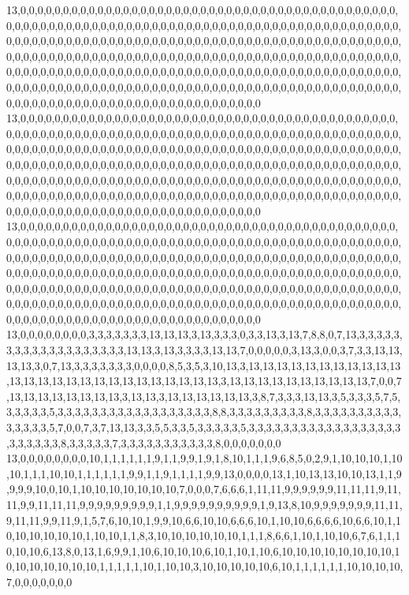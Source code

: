13,0,0,0,0,0,0,0,0,0,0,0,0,0,0,0,0,0,0,0,0,0,0,0,0,0,0,0,0,0,0,0,0,0,0,0,0,0,0,0,0,0,0,0,0,0,0,0,0,0,0,0,0,0,0,0,0,0,0,0,0,0,0,0,0,0,0,0,0,0,0,0,0,0,0,0,0,0,0,0,0,0,0,0,0,0,0,0,0,0,0,0,0,0,0,0,0,0,0,0,0,0,0,0,0,0,0,0,0,0,0,0,0,0,0,0,0,0,0,0,0,0,0,0,0,0,0,0,0,0,0,0,0,0,0,0,0,0,0,0,0,0,0,0,0,0,0,0,0,0,0,0,0,0,0,0,0,0,0,0,0,0,0,0,0,0,0,0,0,0,0,0,0,0,0,0,0,0,0,0,0,0,0,0,0,0,0,0,0,0,0,0,0,0,0,0,0,0,0,0,0,0,0,0,0,0,0,0,0,0,0,0,0,0,0,0,0,0,0,0,0,0,0,0,0,0,0,0,0,0,0,0,0,0,0,0,0,0,0,0,0,0,0,0,0,0,0,0,0,0,0,0,0,0,0,0,0,0,0,0,0,0,0,0,0,0,0,0,0,0,0,0,0,0,0,0,0,0,0,0,0,0,0,0,0,0,0,0,0,0,0,0,0,0,0,0,0,0,0,0,0,0,0,0,0
13,0,0,0,0,0,0,0,0,0,0,0,0,0,0,0,0,0,0,0,0,0,0,0,0,0,0,0,0,0,0,0,0,0,0,0,0,0,0,0,0,0,0,0,0,0,0,0,0,0,0,0,0,0,0,0,0,0,0,0,0,0,0,0,0,0,0,0,0,0,0,0,0,0,0,0,0,0,0,0,0,0,0,0,0,0,0,0,0,0,0,0,0,0,0,0,0,0,0,0,0,0,0,0,0,0,0,0,0,0,0,0,0,0,0,0,0,0,0,0,0,0,0,0,0,0,0,0,0,0,0,0,0,0,0,0,0,0,0,0,0,0,0,0,0,0,0,0,0,0,0,0,0,0,0,0,0,0,0,0,0,0,0,0,0,0,0,0,0,0,0,0,0,0,0,0,0,0,0,0,0,0,0,0,0,0,0,0,0,0,0,0,0,0,0,0,0,0,0,0,0,0,0,0,0,0,0,0,0,0,0,0,0,0,0,0,0,0,0,0,0,0,0,0,0,0,0,0,0,0,0,0,0,0,0,0,0,0,0,0,0,0,0,0,0,0,0,0,0,0,0,0,0,0,0,0,0,0,0,0,0,0,0,0,0,0,0,0,0,0,0,0,0,0,0,0,0,0,0,0,0,0,0,0,0,0,0,0,0,0,0,0,0,0,0,0,0,0,0,0,0,0,0,0,0
13,0,0,0,0,0,0,0,0,0,0,0,0,0,0,0,0,0,0,0,0,0,0,0,0,0,0,0,0,0,0,0,0,0,0,0,0,0,0,0,0,0,0,0,0,0,0,0,0,0,0,0,0,0,0,0,0,0,0,0,0,0,0,0,0,0,0,0,0,0,0,0,0,0,0,0,0,0,0,0,0,0,0,0,0,0,0,0,0,0,0,0,0,0,0,0,0,0,0,0,0,0,0,0,0,0,0,0,0,0,0,0,0,0,0,0,0,0,0,0,0,0,0,0,0,0,0,0,0,0,0,0,0,0,0,0,0,0,0,0,0,0,0,0,0,0,0,0,0,0,0,0,0,0,0,0,0,0,0,0,0,0,0,0,0,0,0,0,0,0,0,0,0,0,0,0,0,0,0,0,0,0,0,0,0,0,0,0,0,0,0,0,0,0,0,0,0,0,0,0,0,0,0,0,0,0,0,0,0,0,0,0,0,0,0,0,0,0,0,0,0,0,0,0,0,0,0,0,0,0,0,0,0,0,0,0,0,0,0,0,0,0,0,0,0,0,0,0,0,0,0,0,0,0,0,0,0,0,0,0,0,0,0,0,0,0,0,0,0,0,0,0,0,0,0,0,0,0,0,0,0,0,0,0,0,0,0,0,0,0,0,0,0,0,0,0,0,0,0,0,0,0,0,0,0
13,0,0,0,0,0,0,0,0,3,3,3,3,3,3,3,13,13,13,3,13,3,3,3,0,3,3,13,3,13,7,8,8,0,7,13,3,3,3,3,3,3,3,3,3,3,3,3,3,3,3,3,3,3,3,13,13,3,13,3,3,3,3,13,13,7,0,0,0,0,0,3,13,3,0,0,3,7,3,3,13,13,13,13,3,0,7,13,3,3,3,3,3,3,3,0,0,0,0,8,5,3,5,3,10,13,3,13,13,13,13,13,13,13,13,13,13,13,13,13,13,13,13,13,13,13,13,13,13,13,13,13,13,3,13,13,13,13,13,13,13,13,13,13,7,0,0,7,13,13,13,13,13,13,13,13,3,13,13,3,13,13,13,13,13,13,3,8,7,3,3,3,13,13,3,5,3,3,3,5,7,5,3,3,3,3,3,5,3,3,3,3,3,3,3,3,3,3,3,3,3,3,3,3,3,3,8,8,3,3,3,3,3,3,3,3,3,8,3,3,3,3,3,3,3,3,3,3,3,3,3,3,3,5,7,0,0,7,3,7,13,13,3,3,5,5,3,3,5,3,3,3,3,3,5,3,3,3,3,3,3,3,3,3,3,3,3,3,3,3,3,3,3,3,3,3,3,3,3,8,3,3,3,3,3,7,3,3,3,3,3,3,3,3,3,3,3,8,0,0,0,0,0,0,0
13,0,0,0,0,0,0,0,0,10,1,1,1,1,1,1,9,1,1,9,9,1,9,1,8,10,1,1,1,9,6,8,5,0,2,9,1,10,10,10,1,10,10,1,1,1,10,10,1,1,1,1,1,1,9,9,1,1,9,1,1,1,1,9,9,13,0,0,0,0,13,1,10,13,13,10,10,13,1,1,9,9,9,9,10,0,10,1,10,10,10,10,10,10,10,7,0,0,0,7,6,6,6,1,11,11,9,9,9,9,9,9,11,11,11,9,11,11,9,9,11,11,11,9,9,9,9,9,9,9,9,9,1,1,9,9,9,9,9,9,9,9,9,9,1,9,13,8,10,9,9,9,9,9,9,9,11,11,9,11,11,9,9,11,9,1,5,7,6,10,10,1,9,9,10,6,6,10,10,6,6,6,10,1,10,10,6,6,6,6,10,6,6,10,1,10,10,10,10,10,10,1,10,10,1,1,8,3,10,10,10,10,10,10,1,1,1,8,6,6,1,10,1,10,10,6,7,6,1,1,10,10,10,6,13,8,0,13,1,6,9,9,1,10,6,10,10,10,6,10,1,10,1,10,6,10,10,10,10,10,10,10,10,10,10,10,10,10,10,10,1,1,1,1,1,10,1,10,10,3,10,10,10,10,10,6,10,1,1,1,1,1,1,10,10,10,10,7,0,0,0,0,0,0,0
